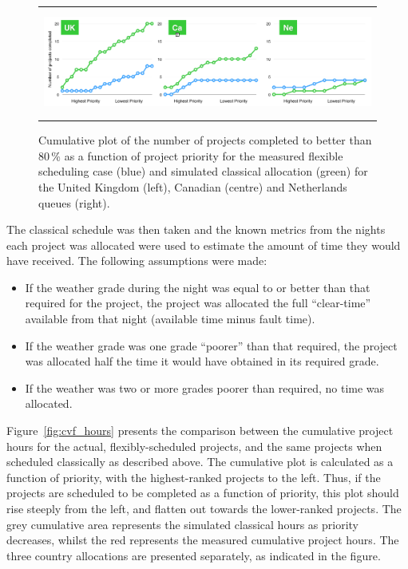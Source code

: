 \documentclass[]{spie}  %
\begin{document}
\begin{figure}[t]
   \begin{center}
   \begin{tabular}{c}
   \includegraphics[height=3.5cm]{numprojcomp_cumul_2007}
   \end{tabular}
   \end{center}
   \caption{\label{fig:cvf_proj} Cumulative plot of the number of projects completed to better than 80\,\% as a function of project priority for the measured flexible scheduling case (blue) and simulated classical allocation (green) for the  United Kingdom (left), Canadian (centre) and Netherlands queues (right).}
\end{figure}

The classical schedule was then taken and the known metrics from the
nights each project was allocated were used to estimate the amount of
time they would have received. The following assumptions were made:
\begin{itemize}
\item If the weather grade during the night was equal to or better
  than that required for the project, the project was allocated the
  full ``clear-time'' available from that night (available time minus
  fault time).
\item If the weather grade was one grade ``poorer'' than that required,
  the project was allocated half the time it would have obtained in
  its required grade.
\item If the weather was two or more grades poorer than required, no
  time was allocated.
\end{itemize}

Figure~\ref{fig:cvf_hours} presents the comparison between the
cumulative project hours for the actual, flexibly-scheduled projects,
and the same projects when scheduled classically as described
above. The cumulative plot is calculated as a function of priority,
with the highest-ranked projects to the left. Thus, if the projects
are scheduled to be completed as a function of priority, this plot
should rise steeply from the left, and flatten out towards the
lower-ranked projects. The grey cumulative area represents the
simulated classical hours as priority decreases, whilst the red
represents the measured cumulative project hours. The three country
allocations are presented separately, as indicated in the figure.
\end{document}
